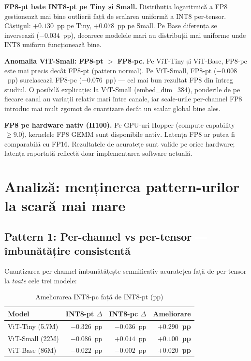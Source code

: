 \documentclass[12pt,a4paper]{article}
\newcommand{\dpos}[1]{\textcolor{posgreen}{\textbf{#1}}}
\begin{document}
\textbf{FP8-pt bate INT8-pt pe Tiny și Small.} Distribuția logaritmică
a FP8 gestionează mai bine outlierii față de scalarea uniformă a INT8
per-tensor. Câștigul: $+0.130$~pp pe Tiny, $+0.078$~pp pe Small.
Pe Base diferența se inversează ($-0.034$~pp), deoarece modelele mari
au distribuții mai uniforme unde INT8 uniform funcționează bine.

\textbf{Anomalia ViT-Small: FP8-pt $>$ FP8-pc.} Pe ViT-Tiny și ViT-Base,
FP8-pc este mai precis decât FP8-pt (pattern normal). Pe ViT-Small,
FP8-pt ($-0.008$~pp) surclasează FP8-pc ($-0.076$~pp) --- cel mai bun
rezultat FP8 din întreg studiul. O posibilă explicație: la ViT-Small
(embed\_dim=384), ponderile de pe fiecare canal au variații relativ mari
între canale, iar scale-urile per-channel FP8 introduc mai mult zgomot
de cuantizare decât un scalar global bine ales.

\textbf{FP8 pe hardware nativ (H100).} Pe GPU-uri Hopper (compute
capability~$\geq 9.0$), kernelele FP8 GEMM sunt disponibile nativ.
Latența FP8 ar putea fi comparabilă cu FP16. Rezultatele de acuratețe
sunt valide pe orice hardware; latența raportată reflectă doar
implementarea software actuală.

\section{Analiză: menținerea pattern-urilor la scară mai mare}

\subsection{Pattern 1: Per-channel vs per-tensor --- îmbunătățire consistentă}

Cuantizarea per-channel îmbunătățește semnificativ acuratețea față de
per-tensor la \emph{toate} cele trei modele:

\begin{table}[H]
  \centering
  \caption{Ameliorarea INT8-pc față de INT8-pt (pp)}
  \begin{tabular}{lrrr}
    \toprule
    \textbf{Model} & \textbf{INT8-pt $\Delta$} & \textbf{INT8-pc $\Delta$} &
    \textbf{Ameliorare} \\
    \midrule
    ViT-Tiny  (5.7M) & $-0.326$~pp & $-0.036$~pp & \dpos{$+0.290$~pp} \\
    ViT-Small (22M)  & $-0.086$~pp & $+0.014$~pp & \dpos{$+0.100$~pp} \\
    ViT-Base  (86M)  & $-0.022$~pp & $-0.002$~pp & \dpos{$+0.020$~pp} \\
    \bottomrule
  \end{tabular}
  \label{tab:ptvspc}
\end{table}
\end{document}
